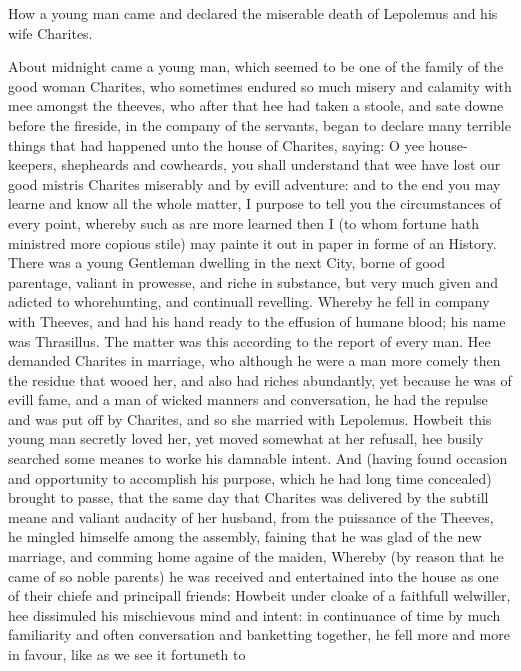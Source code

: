 

How a young man came and declared the miserable death of Lepolemus and his wife
Charites.

About midnight came a young man, which seemed to be one of the family of the
good woman Charites, who sometimes endured so much misery and calamity with mee
amongst the theeves, who after that hee had taken a stoole, and sate downe
before the fireside, in the company of the servants, began to declare many
terrible things that had happened unto the house of Charites, saying: O yee
house-keepers, shepheards and cowheards, you shall understand that wee have
lost our good mistris Charites miserably and by evill adventure: and to the end
you may learne and know all the whole matter, I purpose to tell you the
circumstances of every point, whereby such as are more learned then I (to whom
fortune hath ministred more copious stile) may painte it out in paper in forme
of an History. There was a young Gentleman dwelling in the next City, borne of
good parentage, valiant in prowesse, and riche in substance, but very much
given and adicted to whorehunting, and continuall revelling. Whereby he fell in
company with Theeves, and had his hand ready to the effusion of humane blood;
his name was Thrasillus. The matter was this according to the report of every
man. Hee demanded Charites in marriage, who although he were a man more comely
then the residue that wooed her, and also had riches abundantly, yet because he
was of evill fame, and a man of wicked manners and conversation, he had the
repulse and was put off by Charites, and so she married with Lepolemus. Howbeit
this young man secretly loved her, yet moved somewhat at her refusall, hee
busily searched some meanes to worke his damnable intent. And (having found
occasion and opportunity to accomplish his purpose, which he had long time
concealed) brought to passe, that the same day that Charites was delivered by
the subtill meane and valiant audacity of her husband, from the puissance of
the Theeves, he mingled himselfe among the assembly, faining that he was glad
of the new marriage, and comming home againe of the maiden, Whereby (by reason
that he came of so noble parents) he was received and entertained into the
house as one of their chiefe and principall friends: Howbeit under cloake of a
faithfull welwiller, hee dissimuled his mischievous mind and intent: in
continuance of time by much familiarity and often conversation and banketting
together, he fell more and more in favour, like as we see it fortuneth to

